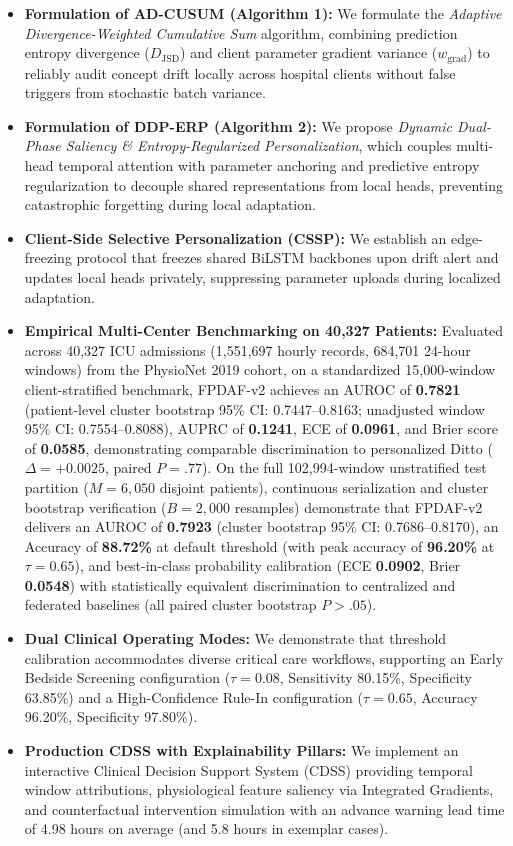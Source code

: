 \documentclass[final,5p,times,twocolumn]{elsarticle}
\begin{document}
\begin{itemize}
    \item \textbf{Formulation of AD-CUSUM (Algorithm 1):} We formulate the \textit{Adaptive Divergence-Weighted Cumulative Sum} algorithm, combining prediction entropy divergence ($D_{\text{JSD}}$) and client parameter gradient variance ($w_{\text{grad}}$) to reliably audit concept drift locally across hospital clients without false triggers from stochastic batch variance.
    \item \textbf{Formulation of DDP-ERP (Algorithm 2):} We propose \textit{Dynamic Dual-Phase Saliency \& Entropy-Regularized Personalization}, which couples multi-head temporal attention with parameter anchoring and predictive entropy regularization to decouple shared representations from local heads, preventing catastrophic forgetting during local adaptation.
    \item \textbf{Client-Side Selective Personalization (CSSP):} We establish an edge-freezing protocol that freezes shared BiLSTM backbones upon drift alert and updates local heads privately, suppressing parameter uploads during localized adaptation.
        \item \textbf{Empirical Multi-Center Benchmarking on 40,327 Patients:} Evaluated across 40,327 ICU admissions (1,551,697 hourly records, 684,701 24-hour windows) from the PhysioNet 2019 cohort, on a standardized 15,000-window client-stratified benchmark, FPDAF-v2 achieves an AUROC of \textbf{0.7821} (patient-level cluster bootstrap 95\% CI: 0.7447--0.8163; unadjusted window 95\% CI: 0.7554--0.8088), AUPRC of \textbf{0.1241}, ECE of \textbf{0.0961}, and Brier score of \textbf{0.0585}, demonstrating comparable discrimination to personalized Ditto ($\Delta = +0.0025$, paired $P = .77$). On the full 102,994-window unstratified test partition ($M=6,050$ disjoint patients), continuous serialization and cluster bootstrap verification ($B=2,000$ resamples) demonstrate that FPDAF-v2 delivers an AUROC of \textbf{0.7923} (cluster bootstrap 95\% CI: 0.7686--0.8170), an Accuracy of \textbf{88.72\%} at default threshold (with peak accuracy of \textbf{96.20\%} at $\tau=0.65$), and best-in-class probability calibration (ECE \textbf{0.0902}, Brier \textbf{0.0548}) with statistically equivalent discrimination to centralized and federated baselines (all paired cluster bootstrap $P > .05$).
\item \textbf{Dual Clinical Operating Modes:} We demonstrate that threshold calibration accommodates diverse critical care workflows, supporting an Early Bedside Screening configuration ($\tau=0.08$, Sensitivity 80.15\%, Specificity 63.85\%) and a High-Confidence Rule-In configuration ($\tau=0.65$, Accuracy 96.20\%, Specificity 97.80\%).
    \item \textbf{Production CDSS with Explainability Pillars:} We implement an interactive Clinical Decision Support System (CDSS) providing temporal window attributions, physiological feature saliency via Integrated Gradients, and counterfactual intervention simulation with an advance warning lead time of 4.98 hours on average (and 5.8 hours in exemplar cases).
\end{itemize}
\end{document}
